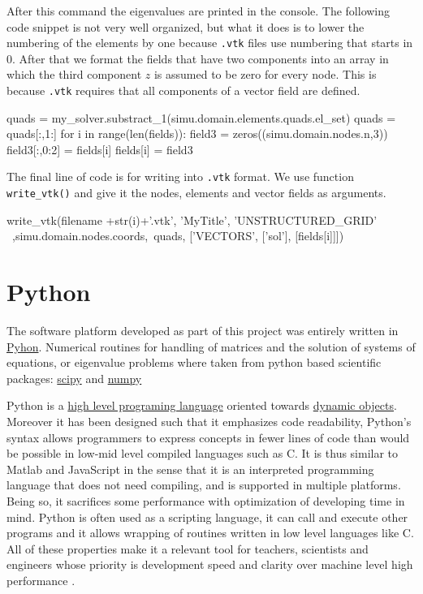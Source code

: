 After this command the eigenvalues are printed in the console. The following code snippet is not very well organized, but what it does is to lower the numbering of the elements by one because \verb|.vtk| files use numbering that starts in 0. After that we format the fields that have two components into an array in which the third component $z$ is assumed to be zero for every node. This is because \verb|.vtk| requires that all components of a vector field are defined.

\begin{python}
quads = my_solver.substract_1(simu.domain.elements.quads.el_set)
quads = quads[:,1:]
for i in range(len(fields)):
    field3 =  zeros((simu.domain.nodes.n,3))
    field3[:,0:2] = fields[i]
    fields[i] = field3
\end{python}

The final line of code is for writing into \verb|.vtk|  format. We use function \verb|write_vtk()| and give it the nodes, elements and vector fields as arguments.
\begin{python}
	write_vtk(filename +str(i)+'.vtk', 'MyTitle', 'UNSTRUCTURED_GRID' \
	 ,simu.domain.nodes.coords,\	 				
        quads, ['VECTORS', ['sol'], [fields[i]]])
\end{python}

\section{Python}
The software platform developed as part of this project was entirely written in \href{http://www.python.org/Python}{Pyhon}. Numerical routines for handling of matrices and the solution of systems of equations, or eigenvalue problems where taken from python based  scientific packages: \href{http://www.scipy.org/}{scipy} and \href{http://www.numpy.org/}{numpy}

Python is a \href{http://en.wikipedia.org/wiki/High-level_programming_language}{high level programing language} oriented towards \href{http://en.wikipedia.org/wiki/Dynamic_programming_language}{dynamic objects}. Moreover it has been designed such that it  emphasizes code readability, Python's syntax allows programmers to express concepts in fewer lines of code than would be possible in low-mid level compiled languages such as C. It is thus similar to Matlab and JavaScript in the sense that it is an interpreted programming language that does not need compiling, and is supported in multiple platforms. Being so, it sacrifices some performance with optimization of developing time in  mind\cite{Georgatos2002}. 
Python is often used as a scripting language, it can call and execute other programs and it allows wrapping of routines written in low level languages like C. All of these properties make it a relevant tool for teachers, scientists and engineers whose priority is development speed and clarity over machine level high performance \cite{Villegas2011, Kiusalaas2005, Baecker2007, Euroscipy2010, Borcherds2007, Langtangen2004}.

